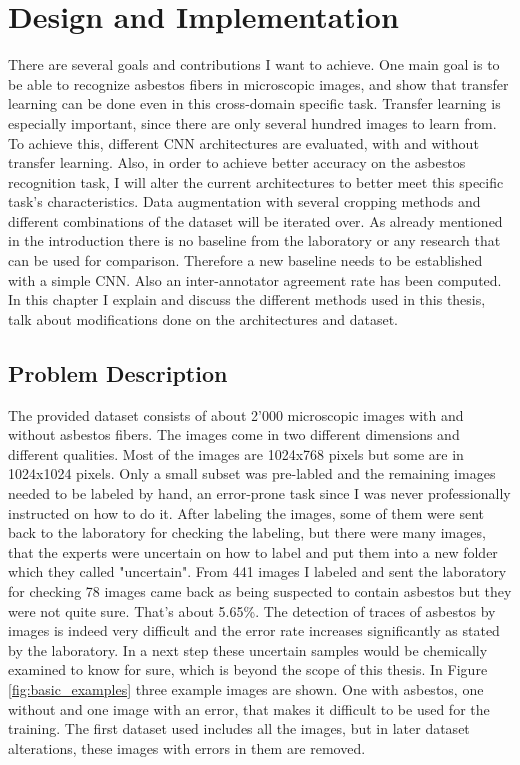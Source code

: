 \chapter{Design and Implementation}


There are several goals and contributions I want to achieve. One main goal is to be able to recognize asbestos fibers in microscopic images, and show that transfer learning can be done even in this cross-domain specific task. Transfer learning is especially important, since there are only several hundred images to learn from. To achieve this, different CNN architectures are evaluated, with and without transfer learning. Also, in order to achieve better accuracy on the asbestos recognition task, I will alter the current architectures to better meet this specific task's characteristics. Data augmentation with several cropping methods and different combinations of the dataset will be iterated over. As already mentioned in the introduction there is no baseline from the laboratory or any research that can be used for comparison. Therefore a new baseline needs to be established with a simple CNN. Also an inter-annotator agreement rate has been computed. In this chapter I explain and discuss the different methods used in this thesis, talk about modifications done on the architectures and dataset.

\section{Problem Description}

The provided dataset consists of about 2'000 microscopic images with and without asbestos fibers. The images come in two different dimensions and different qualities. Most of the images are 1024x768 pixels but some are in 1024x1024 pixels. Only a small subset was pre-labled and the remaining images needed to be labeled by hand, an error-prone task since I was never professionally instructed on how to do it. After labeling the images, some of them were sent back to the laboratory for checking the labeling, but there were many images, that the experts were uncertain on how to label and put them into a new folder which they called  "uncertain". From 441 images I labeled and sent the laboratory for checking 78 images came back as being suspected to contain asbestos but they were not quite sure. That's about 5.65\%. The detection of traces of asbestos by images is indeed very difficult and the error rate increases significantly as stated by the laboratory. In a next step these uncertain samples would be chemically examined to know for sure, which is beyond the scope of this thesis. In Figure \ref{fig:basic_examples} three example images are shown. One with asbestos, one without and one image with an error, that makes it difficult to be used for the training. The first dataset used includes all the images, but in later dataset alterations, these images with errors in them are removed.

